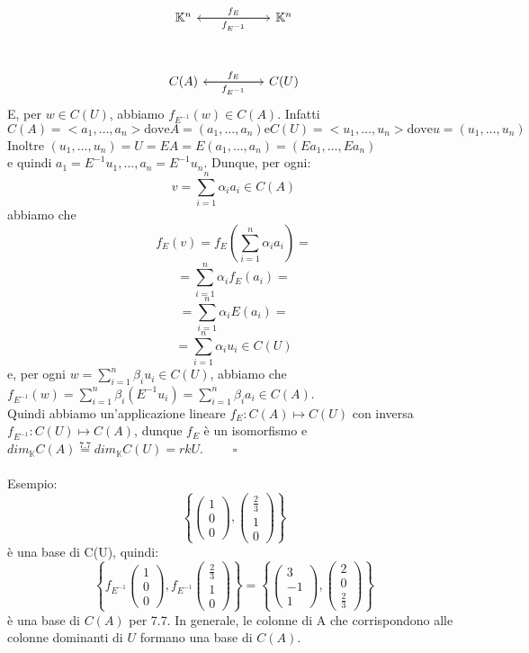 \documentclass[12pt]{article}
\begin{document}
\begin{equation*}
\begin{tikzcd}[row sep=huge]
\mathbb{K}^n \arrow[rr, "f_E"] & & \mathbb{K}^n \arrow[ll, "f_{E^{-1}}"]\\
C(A) \arrow[rr, "f_E"] & & C(U) \arrow[ll, "f_{E^{-1}}"]
\end{tikzcd}
\end{equation*}
E, per $w \in C(U)$, abbiamo $f_{E^{-1}}(w) \in C(A)$. Infatti
\[C(A) = <a_1, \dots, a_n> \text{dove} A = (a_1, \dots, a_n) \text{e} C(U) = <u_1, \dots, u_n> \text{dove} u = (u_1, \dots, u_n)\]
Inoltre $(u_1, \dots, u_n) = U = EA = E(a_1, \dots, a_n) = (Ea_1, \dots, Ea_n)$\\
e quindi $a_1 = E^{-1}u_1, \dots, a_n = E^{-1}u_n$.
Dunque, per ogni:
\[v = \sum^{n}_{i=1} \alpha_i a_i  \in C(A)\]
abbiamo che
\[f_E(v) = f_E\left(\sum^n_{i=1} \alpha_ia_i\right) =\]
\[= \sum^n_{i =1} \alpha_i f_E(a_i) =\]
\[= \sum^n_{i =1} \alpha_i E(a_i) = \]
\[= \sum^n_{i=1} \alpha_i u_i \in C(U)\]
e, per ogni $w = \sum^n_{i=1} \beta_i u_i \in C(U)$, abbiamo che $f_{E^{-1}}(w) = \sum^{n}_{i=1} \beta_i(E^{-1}u_i) = \sum^n_{i=1} \beta_i a_i \in C(A)$.\\
Quindi abbiamo un'applicazione lineare $f_E: C(A) \mapsto C(U)$ con inversa $f_{E^{-1}}: C(U) \mapsto C(A)$, dunque $f_E$ è un isomorfismo e $dim_{\mathbb{K}}C(A) \stackrel{7.7}{=} dim_{\mathbb{K}}C(U) = rkU$. $\quad \quad \square$\\\\
Esempio:
\[\left\{\begin{pmatrix}
    1\\
    0\\
    0
\end{pmatrix}, \begin{pmatrix}
    \frac{2}{3}\\
    1\\
    0
\end{pmatrix}\right\}\]
è una base di C(U), quindi:
\[\left\{f_{E^{-1}} \begin{pmatrix}
    1\\
    0\\
    0
\end{pmatrix}, f_{E^{-1}} \begin{pmatrix}
    \frac{2}{3}\\
    1\\
    0
\end{pmatrix} \right\} = \left\{\begin{pmatrix}
    3\\
    -1\\
    1
\end{pmatrix}, \begin{pmatrix}
    2\\
    0\\
    \frac{2}{3}
\end{pmatrix}\right\}\]
è una base di $C(A)$ per 7.7.
In generale, le colonne di A che corrispondono alle colonne dominanti di $U$ formano una base di $C(A)$.
\end{document}
